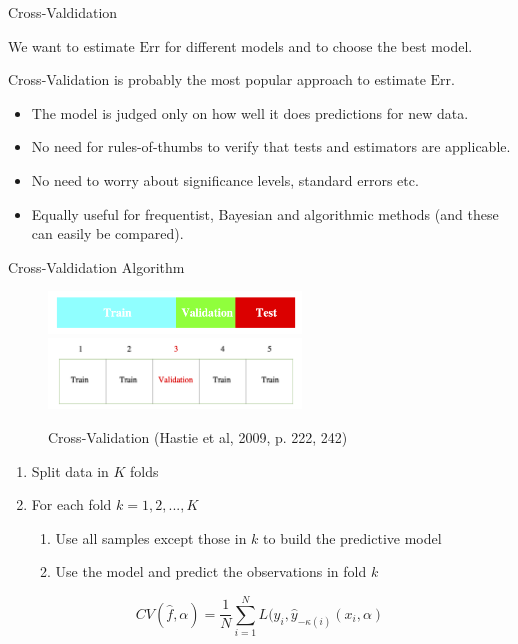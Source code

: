 \documentclass[10pt,handout]{beamer}
\begin{document}
\begin{frame}{Cross-Valdidation}


We want to estimate $\text{Err}$ for different models and to choose the best model.\\[3mm]\pause

Cross-Validation is probably the most popular approach to estimate $\text{Err}$.

\begin{itemize}
\item The model is judged only on how well it does predictions for new data.\\[2mm]\pause
\item No need for rules-of-thumbs to verify that tests and estimators are applicable.\\[2mm]\pause
\item No need to worry about significance levels, standard errors etc.\\[2mm]\pause
\item Equally useful for frequentist, Bayesian and algorithmic methods (and these can easily be compared).\\[3mm]\pause
\end{itemize}


\end{frame}


\begin{frame}{Cross-Valdidation Algorithm}

\begin{figure}[h]
\caption{Cross-Validation (Hastie et al, 2009, p. 222, 242)}
\centering
\includegraphics[width=0.6\textwidth]{figs/ESL_test_train_val.png}
\includegraphics[width=0.6\textwidth]{figs/ESL_cross_val.png}
\end{figure}

\begin{enumerate}
\item Split data in $K$ folds
\item For each fold $k=1,2,...,K$
\begin{enumerate}
\item Use all samples except those in $k$ to build the predictive model
\item Use the model and predict the observations in fold $k$
\end{enumerate}
\end{enumerate}

\[
CV(\hat{f},\alpha) = \frac{1}{N}\sum^N_{i=1} L(y_i,\hat{y}_{-\kappa(i)}(x_i,\alpha)
\]

\end{frame}
\end{document}
